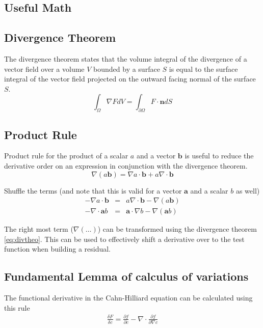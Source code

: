 \documentclass[letter,12pt,fleqn]{article}
\begin{document}
\begin{appendices}
\section{Useful Math}

\subsection{Divergence Theorem}
The divergence theorem states that the volume integral of the divergence of a vector field over a volume $V$ bounded by a surface $S$ is equal to the surface integral of the vector field projected on the outward facing normal of the surface $S$.
\begin{equation}
\int_\Omega \nabla F dV = \int_{\partial\Omega} F\cdot\mathbf{n}dS \label{eq:divtheo}
\end{equation}

\subsection{Product Rule}
Product rule for the product of a scalar $a$ and a vector $\mathbf{b}$ is useful to reduce the derivative order on an expression in conjunction with the divergence theorem. 
\begin{equation}
\nabla (a\mathbf{b})= \nabla a \cdot \mathbf{b} + a \nabla\cdot\mathbf{b} \label{eq:prodrule}
\end{equation}

Shuffle the terms (and note that this is valid for a vector $\mathbf{a}$ and a scalar $b$ as well)
\begin{eqnarray}
-\nabla a \cdot \mathbf{b} & = &  a \nabla\cdot\mathbf{b} - \nabla (a\mathbf{b}) \label{eq:prodrule1} \\
-\nabla \cdot \mathbf{a} b & = &  \mathbf{a}\cdot \nabla b - \nabla (\mathbf{a}b) \label{eq:prodrule2}
\end{eqnarray}

The right most term ($\nabla(\dots)$) can be transformed using the divergence theorem \eqref{eq:divtheo}. This can be used to effectively shift a derivative over to the test function when building a residual.

\subsection{Fundamental Lemma of calculus of variations}
The functional derivative in the Cahn-Hilliard equation can be calculated using this rule
\begin{eqnarray}
\frac{\delta F}{\delta c} = \frac{\partial f}{\partial c} - \nabla \cdot \frac{\partial f}{\partial\nabla c} \label{eq:vlemma}
\end{eqnarray}
\end{appendices}

%
 

\end{document}

